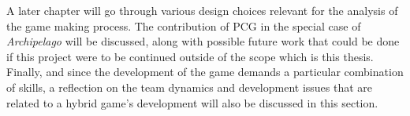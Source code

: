 A later chapter will go through various design choices relevant for the analysis of the game making process. The contribution of PCG in the special case of \textit{Archipelago} will be discussed, along with possible future work that could be done if this project were to be continued outside of the scope which is this thesis. Finally, and since the development of the game demands a particular combination of skills, a reflection on the team dynamics and development issues that are related to a hybrid game's development will also be discussed in this section.